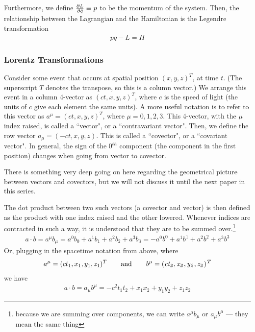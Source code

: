 \documentclass[12pt,epsf]{article}
\def\nolabel{\nonumber }
\def\nolabel{\nonumber }
\begin{document}
Furthermore, we define ${\partial L \over \partial \dot{q}} \equiv p$ to be
the momentum of the system.  Then, the relationship between the
Lagrangian and the Hamiltonian is the Legendre transformation
\begin{eqnarray}
p \dot{q} - L = H \nolabel 
\end{eqnarray}

\subsubsection{Lorentz Transformations}

Consider some event that occurs at spatial position $(x, y, z)^T$, at
time $t$. (The superscript $T$ denotes the transpose, so this is a column vector.)  We
arrange this event in a column \mbox{4-vector} as $(ct,x,y,z)^T$, where $c$
is the speed of light (the units of $c$ give each element the
same units).  A more useful notation is to refer to this vector as
$a^{\mu} = (ct, x,y,z)^T$, where $\mu = 0,1,2,3$.  This 4-vector,
with the $\mu$ index raised, is called a ``vector", or a
``contravariant vector".  Then, we define the row vector $a_{\mu} =
(-ct,x,y,z)$.  This is called a ``covector", or a ``covariant vector". 
In general, the sign of the $0^{th}$ component (the component in the
first position) changes when going from vector to covector.  

There is something very deep going on here regarding the geometrical
picture between vectors and covectors, but we will not discuss it until
the next paper in this series.	

The dot product between two such vectors (a covector and vector) is
then defined as the product with one index raised and the other
lowered.  Whenever indices are contracted in such a way, it is
understood that they are to be summed over.\footnote{because we are
summing over components, we can write $a^{\mu}b_{\mu}$ or $a_{\mu}b^{\mu}$ --- 
they mean the same thing}
\begin{eqnarray}
a \cdot b = a^{\mu}b_{\mu} = a^0b_0+a^1b_1+a^2b_2+a^3b_3 =
-a^0b^0+a^1b^1+a^2b^2+a^3b^3 \nolabel
\end{eqnarray}
Or, plugging in the spacetime notation from above, where 
\begin{eqnarray}
a^{\mu} = (ct_1,x_1,y_1,z_1)^T \qquad \rm and \qquad \it b^{\mu} = (ct_2,x_2,y_2,z_2)^T \nolabel
\end{eqnarray}
we have
\begin{eqnarray}
a\cdot b = a_{\mu}b^{\mu} = -c^2t_1t_2+x_1x_2+y_1y_2+z_1z_2 \nolabel 
\end{eqnarray}
\end{document}

